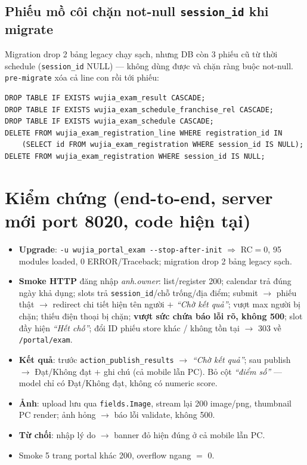 \subsection{Phiếu mồ côi chặn not-null \texttt{session\_id} khi migrate}

Migration drop 2 bảng legacy chạy sạch, nhưng DB còn 3 phiếu cũ từ thời schedule
(\texttt{session\_id} NULL) --- không dùng được và chặn ràng buộc not-null. \texttt{pre-migrate}
xóa cả line con rồi tới phiếu:

\begin{lstlisting}[style=python]
DROP TABLE IF EXISTS wujia_exam_result CASCADE;
DROP TABLE IF EXISTS wujia_exam_schedule_franchise_rel CASCADE;
DROP TABLE IF EXISTS wujia_exam_schedule CASCADE;
DELETE FROM wujia_exam_registration_line WHERE registration_id IN
    (SELECT id FROM wujia_exam_registration WHERE session_id IS NULL);
DELETE FROM wujia_exam_registration WHERE session_id IS NULL;
\end{lstlisting}

\section{Kiểm chứng (end-to-end, server mới port 8020, code hiện tại)}

\begin{itemize}
  \item \textbf{Upgrade}: \texttt{-u wujia\_portal\_exam -{}-stop-after-init} $\Rightarrow$
    RC$=$0, 95 modules loaded, 0 ERROR/Traceback; migration drop 2 bảng legacy sạch.
  \item \textbf{Smoke HTTP} đăng nhập \emph{anh.owner}: list/register 200; calendar trả
    đúng ngày khả dụng; slots trả \texttt{session\_id}/chỗ trống/địa điểm; submit
    $\rightarrow$ phiếu thật $\rightarrow$ redirect chi tiết hiện tên người $+$ \emph{``Chờ
    kết quả''}; vượt max người bị chặn; thiếu điện thoại bị chặn; \textbf{vượt sức chứa
    báo lỗi rõ, không 500}; slot đầy hiện \emph{``Hết chỗ''}; đổi ID phiếu store khác /
    không tồn tại $\rightarrow$ 303 về \texttt{/portal/exam}.
  \item \textbf{Kết quả}: trước \texttt{action\_publish\_results} $\rightarrow$ \emph{``Chờ
    kết quả''}; sau publish $\rightarrow$ Đạt/Không đạt $+$ ghi chú (cả mobile lẫn PC).
    Bỏ cột \emph{``điểm số''} --- model chỉ có Đạt/Không đạt, không có numeric score.
  \item \textbf{Ảnh}: upload lưu qua \texttt{fields.Image}, stream lại 200 image/png,
    thumbnail PC render; ảnh hỏng $\rightarrow$ báo lỗi validate, không 500.
  \item \textbf{Từ chối}: nhập lý do $\rightarrow$ banner đỏ hiện đúng ở cả mobile lẫn PC.
  \item Smoke 5 trang portal khác 200, overflow ngang $=$ 0.
\end{itemize}

